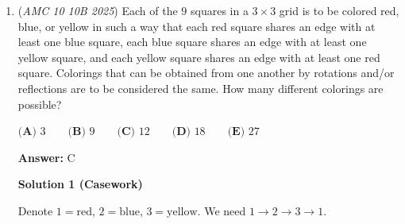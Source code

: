 \begin{enumerate}
\textbf{Solution 3}

Let the centers of the four circles on $AB$, $BC$, $CD$, and $AD$ be $E$, $F$, $G$, and $H$, respectively. Let $r_1$ be equal to the radius of one of the semicircles and $r_2$ be the radius of the inner circle. From the diagram from solution 2, we can easily recognize that $\triangle DHG$ is a $30-60-90$ triangle. We now form an equation $r_1 + r_1\sqrt{3} = 1$. Solving for $r_1$ we will get $\frac{\sqrt{3}-1}{2}$ as the radius. We now need to recognize that $EFGH$ is a square. We can also see that $HF = 2r_1+2r_2$. Because $EFGH$ is a square, and $HG = 2r_1$, we can figure out that $HF = 2r_1\sqrt{2}$. The final step is to plug in $r_1$ and solve for $2r_2$ (not $r_2$ as the question asks for the diameter).

 $2(\frac{\sqrt{3}-1}{2})\sqrt{2} = 2(\frac{\sqrt{3}-1}{2}) + 2r_2$
$(\sqrt{3}-1)\sqrt{2} = \sqrt{3}-1 + 2r_2$
$(\sqrt{3}-1)(\sqrt{2}-1) = 2r_2$

 Thus, the answer is $3 - 1 + 2 - 1 = \boxed{\textbf{(A)}3}$



	\item (\textit{AMC 10 10B 2025}) Each of the $9$ squares in a $3 \times 3$ grid is to be colored red, blue, or yellow in such a way that each red square shares an edge with at least one blue square, each blue square shares an edge with at least one yellow square, and each yellow square shares an edge with at least one red square. Colorings that can be obtained from one another by rotations and/or reflections are to be considered the same. How many different colorings are possible?


 $\textbf{(A) } 3 \qquad \textbf{(B) } 9 \qquad \textbf{(C) } 12 \qquad \textbf{(D) } 18 \qquad \textbf{(E) } 27$

 \textbf{Answer: }C



\textbf{Solution 1 (Casework)}

Denote $1=\text{red}$, $2=\text{blue}$, $3=\text{yellow}$. We need $1\to 2\to 3\to 1$.


\end{enumerate}
